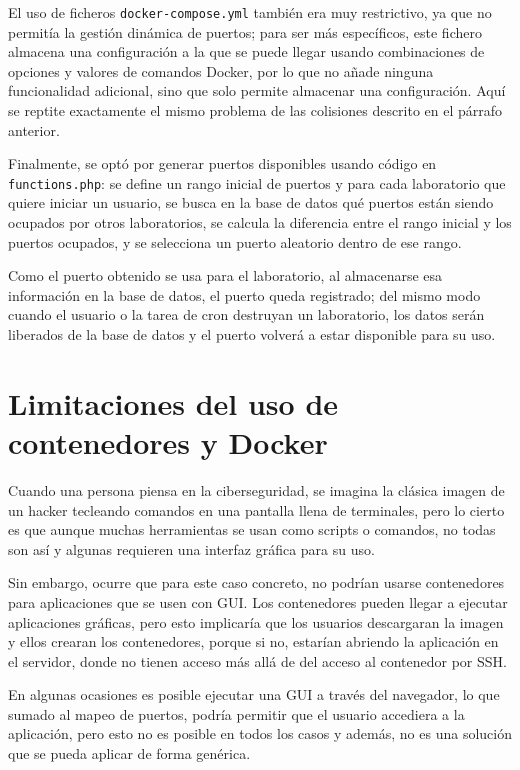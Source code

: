             El uso de ficheros \texttt{docker-compose.yml} también era muy restrictivo, ya que no permitía la gestión dinámica de puertos; para ser más específicos, este fichero almacena una configuración a la que se puede llegar usando combinaciones de opciones y valores de comandos Docker, por lo que no añade ninguna funcionalidad adicional, sino que solo permite almacenar una configuración. Aquí se reptite exactamente el mismo problema de las colisiones descrito en el párrafo anterior.

            Finalmente, se optó por generar puertos disponibles usando código en \texttt{functions.php}: se define un rango inicial de puertos y para cada laboratorio que quiere iniciar un usuario, se busca en la base de datos qué puertos están siendo ocupados por otros laboratorios, se calcula la diferencia entre el rango inicial y los puertos ocupados, y se selecciona un puerto aleatorio dentro de ese rango.

            Como el puerto obtenido se usa para el laboratorio, al almacenarse esa información en la base de datos, el puerto queda registrado; del mismo modo cuando el usuario o la tarea de cron destruyan un laboratorio, los datos serán liberados de la base de datos y el puerto volverá a estar disponible para su uso.


    \section{Limitaciones del uso de contenedores y Docker}
        
        Cuando una persona piensa en la ciberseguridad, se imagina la clásica imagen de un hacker tecleando comandos en una pantalla llena de terminales, pero lo cierto es que aunque muchas herramientas se usan como scripts o comandos, no todas son así y algunas requieren una interfaz gráfica para su uso.

        Sin embargo, ocurre que para este caso concreto, no podrían usarse contenedores para aplicaciones que se usen con GUI. Los contenedores pueden llegar a ejecutar aplicaciones gráficas, pero esto implicaría que los usuarios descargaran la imagen y ellos crearan los contenedores, porque si no, estarían abriendo la aplicación en el servidor, donde no tienen acceso más allá de del acceso al contenedor por SSH.

        En algunas ocasiones es posible ejecutar una GUI a través del navegador, lo que sumado al mapeo de puertos, podría permitir que el usuario accediera a la aplicación, pero esto no es posible en todos los casos y además, no es una solución que se pueda aplicar de forma genérica.
        

